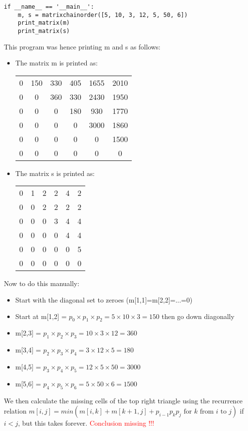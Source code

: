 \documentclass[11pt]{article}
\begin{document}
\begin{enumerate}
\begin{verbatim}
if __name__ == '__main__':
    m, s = matrixchainorder([5, 10, 3, 12, 5, 50, 6])
    print_matrix(m)
    print_matrix(s)
    \end{verbatim}
    This program was hence printing m and s as follows:
    \begin{itemize}
        \item The matrix m is printed as:
        \begin{tabular}{ c c c c c c }
        0 & 150 & 330 & 405 & 1655 & 2010 \\
        0 & 0 & 360 & 330 & 2430 & 1950 \\
        0 & 0 & 0 & 180 & 930 & 1770 \\
        0 & 0 & 0 & 0 & 3000 & 1860 \\
        0 & 0 & 0 & 0 & 0 & 1500 \\
        0 & 0 & 0 & 0 & 0 & 0 \\
        \end{tabular}
        \item The matrix s is printed as:
        \begin{tabular}{ c c c c c c }
        0 & 1 & 2 & 2 & 4 & 2 \\
        0 & 0 & 2 & 2 & 2 & 2 \\
        0 & 0 & 0 & 3 & 4 & 4 \\
        0 & 0 & 0 & 0 & 4 & 4 \\
        0 & 0 & 0 & 0 & 0 & 5 \\
        0 & 0 & 0 & 0 & 0 & 0 \\
        \end{tabular}
    \end{itemize}
    Now to do this manually:
    \begin{itemize}
        \item Start with the diagonal set to zeroes (m[1,1]=m[2,2]=...=0)
        \item Start at m[1,2] = $p_0 \times p_1 \times p_2 = 5 \times 10 \times 3 = 150$ then go down diagonally
        \item m[2,3] = $p_1 \times p_2 \times p_3 = 10 \times 3 \times 12 = 360$
        \item m[3,4] = $p_2 \times p_3 \times p_4 = 3 \times 12 \times 5 = 180$
        \item m[4,5] = $p_3 \times p_4 \times p_5 = 12 \times 5 \times 50 = 3000$
        \item m[5,6] = $p_4 \times p_5 \times p_6 = 5 \times 50 \times 6 = 1500$
    \end{itemize}
    We then calculate the missing cells of the top right triangle using the recurrence relation $m[i,j] = min(m[i,k] + m[k+1, j] + p_{i-1}p_kp_j \mbox{ for } k \mbox{ from } i \mbox{ to } j)$ if $i < j$, but this takes forever.
    \textcolor{red}{Conclusion missing !!!}
    

\end{enumerate}
\end{document}
